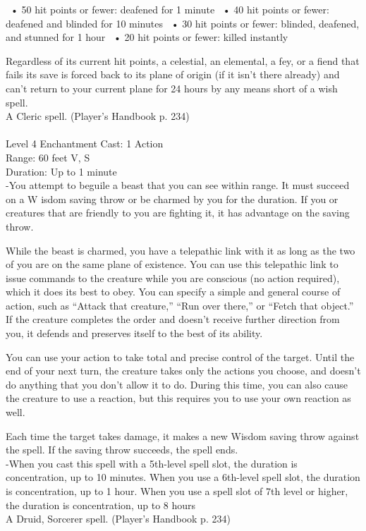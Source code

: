 \documentclass[10pt,twocolumn]{report}
\begin{document}
 •  50 hit points or fewer: deafened for 1 minute 
 •  40 hit points or fewer: deafened and blinded for 10 minutes 
 •  30 hit points or fewer: blinded, deafened, and stunned for 1 hour 
 •  20 hit points or fewer: killed instantly 

Regardless of its current hit points, a celestial, an elemental, a fey, or a fiend that fails its save is forced back to its plane of origin (if it isn’t there already) and can’t return to your current plane for 24 hours by any means short of a wish spell.\\
A Cleric spell. (Player's Handbook p. 234) \\


 \\
Level 4 \quad Enchantment \quad Cast: 1 Action\\
Range: 60 feet \quad V, S\\
Duration: Up to 1 minute \quad \\
-You attempt to beguile a beast that you can see within range. 
It must succeed on a W isdom saving throw or be charmed by you for the duration. If you or creatures that are friendly to you are fighting it, it has advantage on the saving throw. 

While the beast is charmed, you have a telepathic link with it as long as the two of you are on the same plane of existence. You can use this telepathic link to issue commands to the creature while you are conscious (no action required), which it does its best to obey. You can specify a simple and general course of action, such as “Attack that creature,” “Run over there,” or “Fetch that object.” If the creature completes the order and doesn’t receive further direction from you, it defends and preserves itself to the best of its ability. 

You can use your action to take total and precise control of the target. Until the end of your next turn, the creature takes only the actions you choose, and doesn’t do anything that you don’t allow it to do. During this time, you can also cause the creature to use a reaction, but this requires you to use your own reaction as well. 

Each time the target takes damage, it makes a new Wisdom saving throw against the spell. If the saving throw succeeds, the spell ends.\\
-When you cast this spell with a 5th-level spell slot, the duration is concentration, up to 10 minutes. 
When you use a 6th-level spell slot, the duration is concentration, up to 1 hour. 
When you use a spell slot of 7th level or higher, the duration is concentration, up to 8 hours\\
A Druid, Sorcerer spell. (Player's Handbook p. 234) \\
\end{document}
